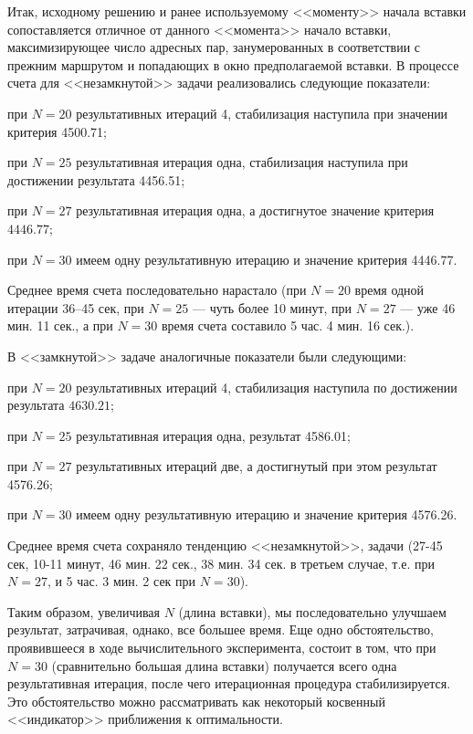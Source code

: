\documentclass[11pt,twoside,openany]{report}
\begin{document}
{{Итак, исходному решению и ранее используемому <<моменту>> начала
вставки сопоставляется отличное от данного <<момента>> начало вставки, максимизирующее
число адресных пар, занумерованных в соответствии с прежним маршрутом и попадающих в
окно предполагаемой вставки. В процессе счета для <<незамкнутой>> задачи
реализовались следующие показатели:

при $N=20$ результативных итераций 4, стабилизация наступила при значении критерия 4500.71;

при $N=25$ результативная итерация одна, стабилизация наступила при достижении результата 4456.51;

при $N=27$ результативная итерация одна, а достигнутое значение критерия $4446.77$;

при $N=30$ имеем одну результативную итерацию и значение критерия 4446.77.

Среднее время счета последовательно нарастало (при $N=20$ время одной итерации 36--45 сек, при $N=25$ ---
чуть более 10 минут, при $N=27$ --- уже 46 мин. 11 сек., а при $N=30$ время счета составило 5 час. 4 мин. 16 сек.).


В <<замкнутой>> задаче аналогичные показатели были следующими:

при $N=20$ результативных итераций 4, стабилизация наступила по достижении результата $4630.21$;

при $N=25$ результативная итерация одна, результат 4586.01;

при $N=27$ результативных итераций две, а достигнутый при этом результат 4576.26;

при $N=30$ имеем одну результативную итерацию и значение критерия 4576.26.

Среднее время счета сохраняло тенденцию <<незамкнутой>>, задачи (27-45 сек, 10-11 минут,
46 мин. 22 сек., 38 мин. 34 сек. в третьем случае, т.е. при $N=27$, и 5 час. 3 мин. 2 сек при $N=30$).

Таким образом, увеличивая $N$ (длина вставки), мы последовательно улучшаем
результат, затрачивая, однако, все большее время. Еще одно обстоятельство,
проявившееся в ходе вычислительного эксперимента, состоит в том, что при
$N=30$ (сравнительно большая длина вставки) получается всего одна результативная
итерация, после чего итерационная процедура стабилизируется. Это обстоятельство
можно рассматривать как некоторый косвенный <<индикатор>> приближения к
оптимальности.







}}
\end{document}
